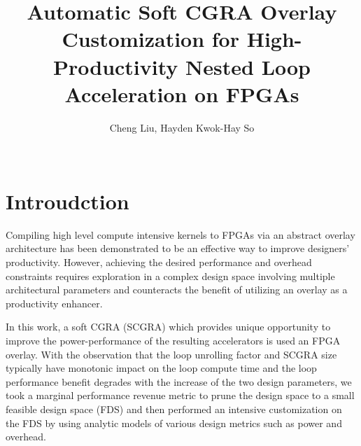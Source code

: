 \documentclass{acm_proc_article-sp}
\begin{document}
\title{Automatic Soft CGRA Overlay Customization for High-Productivity 
Nested Loop Acceleration on FPGAs}

 \author{
 \alignauthor
 Cheng Liu, Hayden Kwok-Hay So\\
        \\
 }
\maketitle


\section{Introudction} \label{introduction}
Compiling high level compute intensive kernels 
to FPGAs via an abstract overlay architecture 
has been demonstrated to be an effective way to 
improve designers' productivity. 
However, achieving the desired performance and 
overhead constraints requires exploration in a 
complex design space involving multiple 
architectural parameters and counteracts 
the benefit of utilizing an overlay 
as a productivity enhancer.

In this work, a soft CGRA (SCGRA) which provides unique 
opportunity to improve the power-performance of the 
resulting accelerators is used an FPGA overlay. 
With the observation that the loop unrolling factor and SCGRA size 
typically have monotonic 
impact on the loop compute time and the loop performance 
benefit degrades with the increase of the two design parameters, 
we took a marginal performance revenue metric to prune the 
design space to a small feasible design space (FDS) and then 
performed an intensive customization on the 
FDS by using analytic models of various design metrics 
such as power and overhead.
\end{document}
